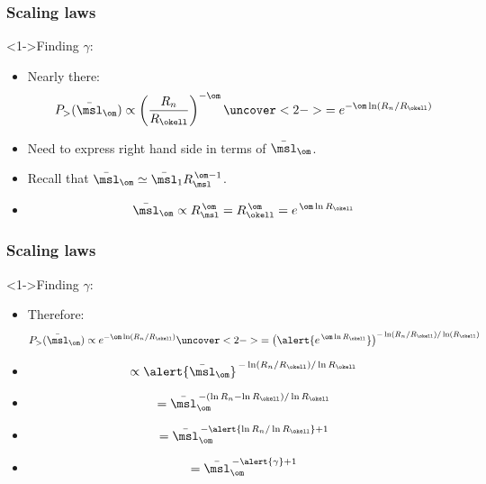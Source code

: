 \begin{frame}[label=]
  \frametitle{Scaling laws}

  \begin{block}<1->{Finding $\gamma$:}
    \begin{itemize}
    \item<1-> Nearly there:
      $$
      P_> (\bar{\msl}_\om)
      \propto
      \left(
        \frac{R_n}{R_\okell}
      \right)^{-\om}
      \uncover<2->{
        =
        e^{-\om \ln (R_n/R_\okell)}
      }
      $$
    \item<3-> 
      Need to express right hand side in terms of $\bar{\msl}_\om$.
    \item<4-> 
      Recall that $\bar{\msl}_\om \simeq \bar{\msl}_1 R_\msl^{\, \om-1}$.
    \item<5->
      $$
      \bar{\msl}_\om \propto R_\msl^{\, \om} = R_\okell^{\, \om} = e^{\, \om\ln{R_\okell}}
      $$
    \end{itemize}
  \end{block}

\end{frame}

\begin{frame}[label=]
  \frametitle{Scaling laws}

  \begin{block}<1->{Finding $\gamma$:}
    \begin{itemize}
    \item<1-> Therefore:
      $$
      P_> (\bar{\msl}_\om)
      \propto
      e^{-\om \ln (R_n/R_\okell)}
      \uncover<2->{
        =
        \left(
          \alert{e^{\, \om \ln R_\okell}}
        \right)^{-\ln (R_n/R_\okell)/\ln(R_\okell)}
      }
      $$
      \item<3->
        $$
        \propto
        \alert{\bar{\msl}_\om}^{\, -\ln(R_n/R_\okell)/\ln R_\okell}
        $$
      \item<4->
        $$
        =
        \bar{\msl}_\om^{\, -(\ln R_n - \ln R_\okell)/\ln R_\okell}
        $$
      \item<5->
        $$
        =
        \bar{\msl}_\om^{\, - \alert{\ln R_n/\ln R_\okell} + 1}
        $$
      \item<6->
        $$
        =
        \bar{\msl}_\om^{\, -\alert{\gamma} + 1}
        $$
    \end{itemize}
  \end{block}

\end{frame}

